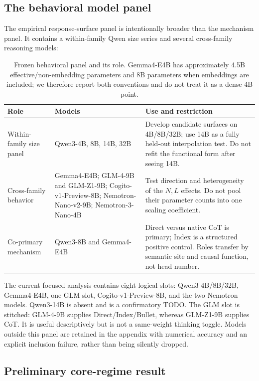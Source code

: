 \subsection{The behavioral model panel}

The empirical response-surface panel is intentionally broader than the mechanism panel. It contains a within-family Qwen size series and several cross-family reasoning models:
\begin{table}[H]
\centering
\small
\caption{Frozen behavioral panel and its role. Gemma4-E4B has approximately 4.5B effective/non-embedding parameters and 8B parameters when embeddings are included; we therefore report both conventions and do not treat it as a dense 4B point.}
\label{tab:model-panel}
\begin{tabularx}{\textwidth}{@{}P{.23\textwidth}P{.34\textwidth}Y@{}}
\toprule
Role & Models & Use and restriction \\
\midrule
Within-family size panel
  & Qwen3-4B, 8B, 14B, 32B
  & Develop candidate surfaces on 4B/8B/32B; use 14B as a fully held-out interpolation test. Do not refit the functional form after seeing 14B. \\
Cross-family behavior
  & Gemma4-E4B; GLM-4-9B and GLM-Z1-9B; Cogito-v1-Preview-8B; Nemotron-Nano-v2-9B; Nemotron-3-Nano-4B
  & Test direction and heterogeneity of the \(N,L\) effects. Do not pool their parameter counts into one scaling coefficient. \\
Co-primary mechanism
  & Qwen3-8B and Gemma4-E4B
  & Direct versus native CoT is primary; Index is a structured positive control. Roles transfer by semantic site and causal function, not head number. \\
\bottomrule
\end{tabularx}
\end{table}

The current focused analysis contains eight logical slots: Qwen3-4B/8B/32B, Gemma4-E4B, one GLM slot, Cogito-v1-Preview-8B, and the two Nemotron models. Qwen3-14B is absent and is a confirmatory TODO. The GLM slot is stitched: GLM-4-9B supplies Direct/Index/Bullet, whereas GLM-Z1-9B supplies CoT. It is useful descriptively but is not a same-weight thinking toggle. Models outside this panel are retained in the appendix with numerical accuracy and an explicit inclusion failure, rather than being silently dropped.

\subsection{Preliminary core-regime result}

